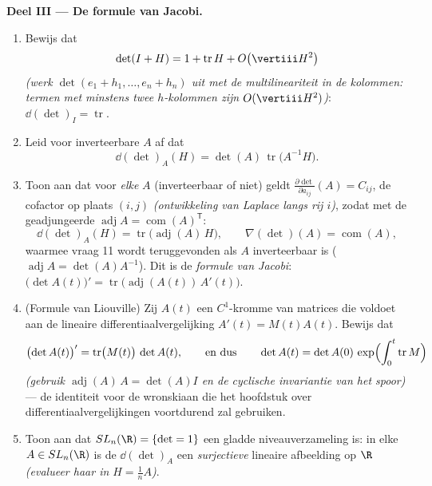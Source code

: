 \begin{problem}
\medskip
\noindent\textbf{Deel III --- De formule van Jacobi.}
\begin{enumerate}[resume]
  \item Bewijs dat
        \[
        \det(I + H) = 1 + \operatorname{tr}H +
        O\bigl(\vertiii H^2\bigr)
        \]
        \emph{(werk $\det(e_1 + h_1, \dots, e_n + h_n)$ uit met
        de multilineariteit in de kolommen: termen met minstens
        twee $h$-kolommen zijn $O(\vertiii H^2)$)}: $\dd(\det)_I =
        \operatorname{tr}$.
  \item Leid voor inverteerbare $A$ af dat
        \[
        \dd(\det)_A(H) = \det(A)\,
        \operatorname{tr}\bigl(A^{-1}H\bigr) .
        \]
  \item Toon aan dat voor \emph{elke} $A$ (inverteerbaar of niet)
        geldt $\frac{\partial\det}{\partial a_{ij}}(A) = C_{ij}$,
        de cofactor op plaats $(i,j)$ \emph{(ontwikkeling van
        Laplace langs rij $i$)}, zodat met de geadjungeerde
        $\operatorname{adj}A = \operatorname{com}(A)^{\mathsf T}$:
        \[
        \dd(\det)_A(H) =
        \operatorname{tr}\bigl(\operatorname{adj}(A)\,H\bigr),
        \qquad
        \nabla(\det)(A) = \operatorname{com}(A) ,
        \]
        waarmee vraag 11 wordt teruggevonden als $A$ inverteerbaar
        is ($\operatorname{adj}A = \det(A)A^{-1}$). Dit is de
        \emph{formule van Jacobi}: $\bigl(\det A(t)\bigr)' =
        \operatorname{tr}\bigl(\operatorname{adj}(A(t))\,A'(t)\bigr)$.
  \item (Formule van Liouville) Zij $A(t)$ een $C^1$-kromme van
        matrices die voldoet aan de lineaire
        differentiaalvergelijking $A'(t) = M(t)A(t)$. Bewijs dat
        \[
        \bigl(\det A(t)\bigr)' =
        \operatorname{tr}\bigl(M(t)\bigr)\,\det A(t),
        \qquad\text{en dus}\qquad
        \det A(t) = \det A(0)\,
        \exp\Bigl(\int_0^t\operatorname{tr}M\Bigr)
        \]
        \emph{(gebruik $\operatorname{adj}(A)\,A = \det(A)I$ en de
        cyclische invariantie van het spoor)} --- de identiteit
        voor de wronskiaan die het hoofdstuk over
        differentiaalvergelijkingen voortdurend zal gebruiken.
  \item Toon aan dat $SL_n(\R) = \{\det = 1\}$ een gladde
        niveauverzameling is: in elke $A \in SL_n(\R)$ is de
         $\dd(\det)_A$ een \emph{surjectieve}
        lineaire afbeelding op $\R$ \emph{(evalueer haar in $H =
        \frac1nA$)}.
\end{enumerate}


\end{problem}
